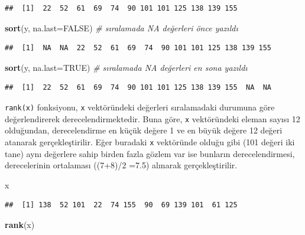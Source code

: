 \documentclass[
]{book}
\newenvironment{Shaded}{\begin{snugshade}}{\end{snugshade}}
\newcommand{\AttributeTok}[1]{\textcolor[rgb]{0.13,0.29,0.53}{#1}}
\newcommand{\CommentTok}[1]{\textcolor[rgb]{0.56,0.35,0.01}{\textit{#1}}}
\newcommand{\ConstantTok}[1]{\textcolor[rgb]{0.56,0.35,0.01}{#1}}
\newcommand{\FunctionTok}[1]{\textcolor[rgb]{0.13,0.29,0.53}{\textbf{#1}}}
\newcommand{\NormalTok}[1]{#1}
\begin{document}
\begin{verbatim}
##  [1]  22  52  61  69  74  90 101 101 125 138 139 155
\end{verbatim}

\begin{Shaded}
\begin{Highlighting}[]
\FunctionTok{sort}\NormalTok{(y, }\AttributeTok{na.last=}\ConstantTok{FALSE}\NormalTok{)      }\CommentTok{\# sıralamada NA değerleri önce yazıldı }
\end{Highlighting}
\end{Shaded}

\begin{verbatim}
##  [1]  NA  NA  22  52  61  69  74  90 101 101 125 138 139 155
\end{verbatim}

\begin{Shaded}
\begin{Highlighting}[]
\FunctionTok{sort}\NormalTok{(y, }\AttributeTok{na.last=}\ConstantTok{TRUE}\NormalTok{)       }\CommentTok{\# sıralamada NA değerleri en sona yazıldı }
\end{Highlighting}
\end{Shaded}

\begin{verbatim}
##  [1]  22  52  61  69  74  90 101 101 125 138 139 155  NA  NA
\end{verbatim}

\texttt{rank(x)} fonksiyonu, \texttt{x} vektöründeki değerleri sıralamadaki durumuna göre değerlendirerek derecelendirmektedir. Buna göre, \texttt{x} vektöründeki eleman sayısı 12 olduğundan, derecelendirme en küçük değere 1 ve en büyük değere 12 değeri atanarak gerçekleştirilir. Eğer buradaki \texttt{x} vektöründe olduğu gibi (101 değeri iki tane) aynı değerlere sahip birden fazla gözlem var ise bunların derecelendirmesi, derecelerinin ortalaması ((7+8)/2 =7.5) alınarak gerçekleştirilir.

\begin{Shaded}
\begin{Highlighting}[]
\NormalTok{x}
\end{Highlighting}
\end{Shaded}

\begin{verbatim}
##  [1] 138  52 101  22  74 155  90  69 139 101  61 125
\end{verbatim}

\begin{Shaded}
\begin{Highlighting}[]
\FunctionTok{rank}\NormalTok{(x)}
\end{Highlighting}
\end{Shaded}
\end{document}
